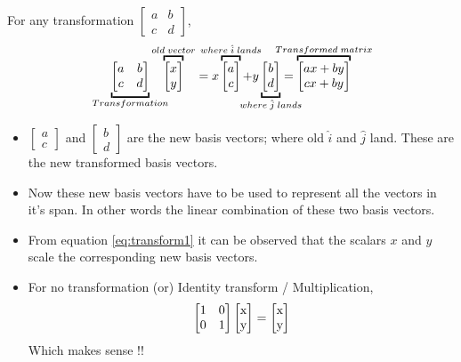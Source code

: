 \documentclass[	DIV=calc,%
paper=a4,%
fontsize=11pt,%
twocolumn]{scrartcl} %
\newcommand{\tctmat}[4]{\begin{bmatrix}
		$#1$ & $#2$\\
		$#3$ & $#4$
\end{bmatrix}}
\newcommand{\tcomat}[2]{\begin{bmatrix}
		$#1$\\
		$#2$
\end{bmatrix}}
\begin{document}
For any transformation $\begin{bmatrix}
	a & b\\
	c & d
\end{bmatrix}$,
\begin{equation} \label{eq:transform1}\underbracket{
	 \begin{bmatrix}
		a & b\\
		c & d
	\end{bmatrix}}_{\mathclap{Transformation}} \overbracket{\begin{bmatrix}
	x\\
	y
\end{bmatrix}}^{old \; vector}=x  \overbracket{\begin{bmatrix}
a\\
c 
\end{bmatrix}}^{\mathclap{where \; \hat{i} \;  lands}} + y \underbracket{\begin{bmatrix}
b\\
d
\end{bmatrix}}_{\mathclap{where \; \hat{j} \; lands}} = \overbracket{\begin{bmatrix}
ax+by\\
cx+by
\end{bmatrix}}^{\mathclap{Transformed \; matrix}}
\end{equation}
\begin{itemize}
	\item $\begin{bmatrix}
		a\\
		c
	\end{bmatrix}$ and $\begin{bmatrix}
	b\\
	d
\end{bmatrix}$ are the new basis vectors; where old $\hat{i}$ and $\hat{j}$ land. These are the new transformed basis vectors.

\item Now these new basis vectors have to be used to represent all the vectors in it's span. In other words the linear combination of these two basis vectors.

\item From equation \ref{eq:transform1} it can be observed that the scalars $x$  and $y$ scale the corresponding new basis vectors.

	\item For no transformation (or) Identity transform / Multiplication,
	\begin{equation}
		\tctmat{1}{0}{0}{1} \tcomat{x}{y} = \tcomat{x}{y}
	\end{equation}
	Which makes sense !!
\end{itemize}
\end{document}

